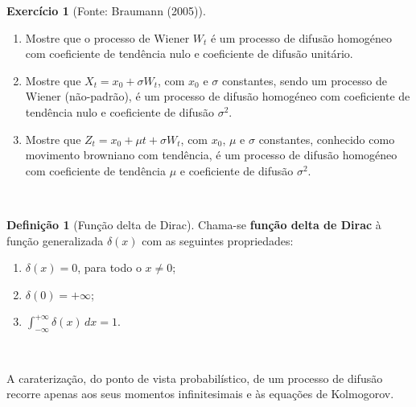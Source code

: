 \documentclass[
  11pt,
  a4paper,
]{book}
\theoremstyle{definition}
\newtheorem{definition}{Definição}[chapter]
\theoremstyle{definition}
\theoremstyle{definition}
\newtheorem{exercise}{Exercício}[chapter]
\theoremstyle{definition}
\theoremstyle{remark}
\begin{document}
\begin{exercise}[Fonte: Braumann (2005)]
\leavevmode

\begin{enumerate}
\def\labelenumi{(\roman{enumi})}
\item
  Mostre que o processo de Wiener \(W_t\) é um processo de difusão homogéneo com coeficiente de tendência nulo e coeficiente de difusão unitário.
\item
  Mostre que \(X_t = x_0 + \sigma W_t\), com \(x_0\) e \(\sigma\) constantes, sendo um processo de Wiener (não-padrão), é um processo de difusão homogéneo com coeficiente de tendência nulo e coeficiente de difusão \(\sigma^2\).
\item
  Mostre que \(Z_t = x_0 + \mu t + \sigma W_t\), com \(x_0\), \(\mu\) e \(\sigma\) constantes, conhecido como movimento browniano com tendência, é um processo de difusão homogéneo com coeficiente de tendência \(\mu\) e coeficiente de difusão \(\sigma^2\).
\end{enumerate}

\end{exercise}

\(\,\)

\begin{definition}[Função delta de Dirac]

Chama-se \textbf{função delta de Dirac} à função generalizada \(\delta(x)\) com as seguintes propriedades:

\begin{enumerate}
\def\labelenumi{\arabic{enumi}.}
\item
  \(\delta(x) = 0\), para todo o \(x \neq 0\);
\item
  \(\delta(0) = +\infty\);
\item
  \(\displaystyle \int_{-\infty}^{+\infty} \delta(x)\,dx = 1\).
\end{enumerate}

\end{definition}

\(\,\)

A caraterização, do ponto de vista probabilístico, de um processo de difusão recorre apenas aos seus momentos infinitesimais e às equações de Kolmogorov.

\(\,\)
\end{document}
